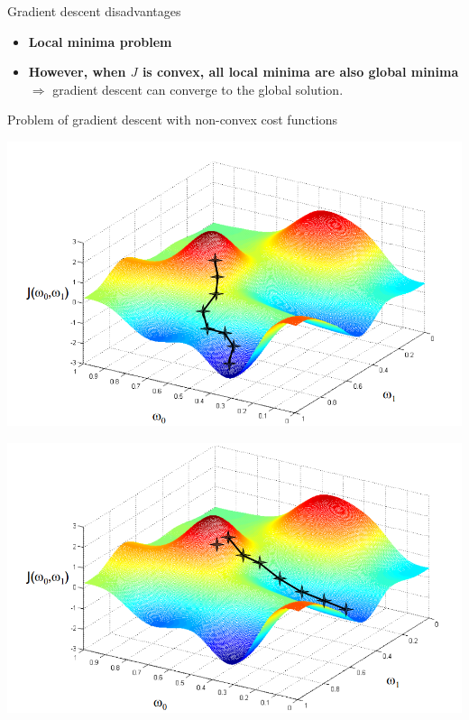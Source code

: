 \documentclass[serif, aspectratio=169]{beamer}
\begin{document}
\begin{frame}{Gradient descent disadvantages}

\begin{itemize}
    \item \textbf{Local minima problem}
    
    \item \textbf{However, when \( J \) is convex, all local minima are also global minima} \(\Rightarrow\) gradient descent can converge to the global solution.
\end{itemize}

\end{frame}

\begin{frame}{Problem of gradient descent with non-convex cost functions}

\begin{minipage}{0.5\textwidth}
    \centering
    \includegraphics[width=\textwidth]{pic/7.png}
\end{minipage}%
\begin{minipage}{0.5\textwidth}
    \centering
    \includegraphics[width=\textwidth]{pic/8.png}
\end{minipage}

\end{frame}
\end{document}
